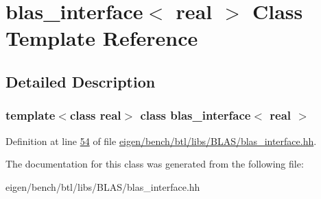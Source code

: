 \hypertarget{classblas__interface}{}\section{blas\+\_\+interface$<$ real $>$ Class Template Reference}
\label{classblas__interface}


\subsection{Detailed Description}
\subsubsection*{template$<$class real$>$\newline
class blas\+\_\+interface$<$ real $>$}



Definition at line \hyperlink{eigen_2bench_2btl_2libs_2_b_l_a_s_2blas__interface_8hh_source_l00054}{54} of file \hyperlink{eigen_2bench_2btl_2libs_2_b_l_a_s_2blas__interface_8hh_source}{eigen/bench/btl/libs/\+B\+L\+A\+S/blas\+\_\+interface.\+hh}.



The documentation for this class was generated from the following file\+:\begin{DoxyCompactItemize}
\item 
eigen/bench/btl/libs/\+B\+L\+A\+S/blas\+\_\+interface.\+hh\end{DoxyCompactItemize}
